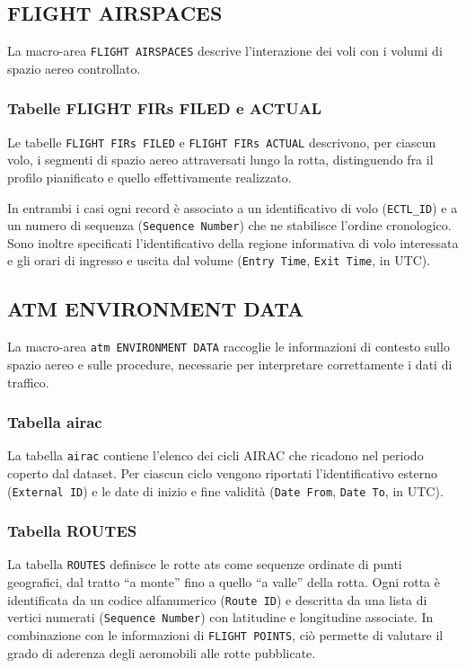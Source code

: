 \subsection{FLIGHT AIRSPACES}
\label{sec:flight_airspace}
La macro-area \texttt{FLIGHT AIRSPACES} descrive l’interazione dei voli con i volumi di spazio aereo controllato.

\subsubsection{Tabelle FLIGHT FIRs FILED e ACTUAL}
Le tabelle \texttt{FLIGHT FIRs FILED} e \texttt{FLIGHT FIRs ACTUAL} descrivono, per ciascun volo, i segmenti di spazio aereo attraversati lungo la rotta, distinguendo fra il profilo pianificato e quello effettivamente realizzato.

In entrambi i casi ogni record è associato a un identificativo di volo (\texttt{ECTL\_ID}) e a un numero di sequenza (\texttt{Sequence Number}) che ne stabilisce l’ordine cronologico. Sono inoltre specificati l’identificativo della regione informativa di volo interessata e gli orari di ingresso e uscita dal volume (\texttt{Entry Time}, \texttt{Exit Time}, in UTC).

\subsection{ATM ENVIRONMENT DATA}
\label{sec:atm_env}
La macro-area \texttt{\gls{atm} ENVIRONMENT DATA} raccoglie le informazioni di contesto sullo spazio aereo e sulle procedure, necessarie per interpretare correttamente i dati di traffico.

\subsubsection{Tabella \gls{airac}}
La tabella \texttt{\gls{airac}} contiene l’elenco dei cicli AIRAC che ricadono nel periodo coperto dal dataset.  
Per ciascun ciclo vengono riportati l’identificativo esterno (\texttt{External ID}) e le date di inizio e fine validità (\texttt{Date From}, \texttt{Date To}, in UTC). 
\subsubsection{Tabella ROUTES}
La tabella \texttt{ROUTES} definisce le rotte \gls{ats} come sequenze ordinate di punti geografici, dal tratto “a monte” fino a quello “a valle” della rotta.  
Ogni rotta è identificata da un codice alfanumerico (\texttt{Route ID}) e descritta da una lista di vertici numerati (\texttt{Sequence Number}) con latitudine e longitudine associate. In combinazione con le informazioni di \texttt{FLIGHT POINTS}, ciò permette di valutare il grado di aderenza degli aeromobili alle rotte pubblicate.

